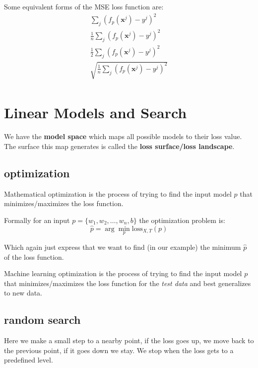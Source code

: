 \documentclass[12pt]{article}
\begin{document}
Some equivalent forms of the MSE loss function are:
\begin{align*}
    \sum_j (f_p(\mathbf{x}^j) - y^j)^2 \\
    \frac{1}{n}\sum_j (f_p(\mathbf{x}^j) - y^j)^2 \\
    \frac{1}{2}\sum_j (f_p(\mathbf{x}^j) - y^j)^2 \\
    \sqrt{\frac{1}{n}\sum_j (f_p(\mathbf{x}^j) - y^j)^2} \\
\end{align*}

\section{Linear Models and Search}
We have the \textbf{model space} which maps all possible models to their loss value. The surface this map generates is called the \textbf{loss surface/loss landscape}.

\subsection{optimization}

\begin{definition}
    Mathematical optimization is the process of trying to find the input model $p$ that minimizes/maximizes the loss function.
\end{definition}

Formally for an input $p = \{w_1, w_2, \ldots, w_n, b\}$ the optimization problem is:
\begin{equation}
    \hat{p} = \arg\min_{p} \text{loss}_{X, T}(p)
\end{equation}

Which again just express that we want to find (in our example) the minimum $\hat{p}$ of the loss function.

\begin{definition}
    Machine learning optimization is the process of trying to find the input model $p$ that minimizes/maximizes the loss function for the \textit{test data} and best generalizes to new data.
\end{definition}

\subsection{random search}
Here we make a small step to a nearby point, if the loss goes up, we move back to the previous point, if it goes down we stay. We stop when the loss gets to a predefined level.
\end{document}
